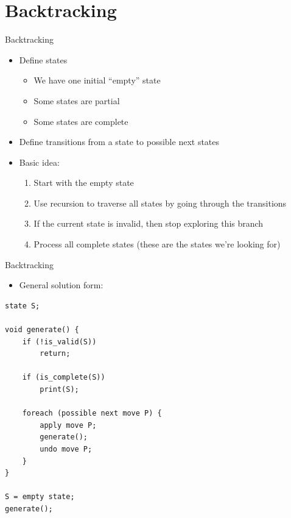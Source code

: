 \documentclass{beamer}
\begin{document}
\section*{Backtracking}

\begin{frame}{Backtracking}
    \begin{itemize}
        \item Define states
            \begin{itemize}
                \item We have one initial ``empty'' state
                \item Some states are partial
                \item Some states are complete
            \end{itemize}
        \vspace{10pt}
        \item Define transitions from a state to possible next states
        \vspace{10pt}
        \item Basic idea:
            \begin{enumerate}
                \item Start with the empty state
                \item Use recursion to traverse all states by going through the transitions
                \item If the current state is invalid, then stop exploring this branch
                \item Process all complete states (these are the states we're looking for)
            \end{enumerate}
    \end{itemize}
\end{frame}


\begin{frame}{Backtracking}
    \begin{itemize}
        \item General solution form:
    \end{itemize}

    \begin{verbatim}
state S;

void generate() {
    if (!is_valid(S))
        return;

    if (is_complete(S))
        print(S);

    foreach (possible next move P) {
        apply move P;
        generate();
        undo move P;
    }
}

S = empty state;
generate();
    \end{verbatim}
\end{frame}
\end{document}
